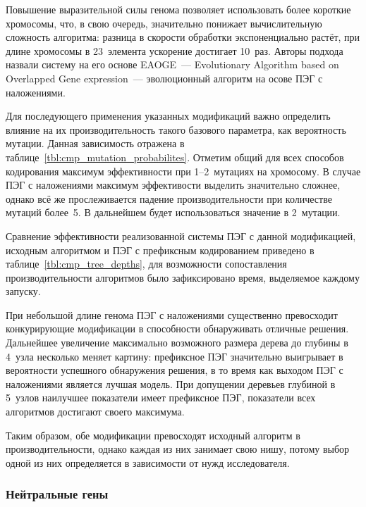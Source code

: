 Повышение выразительной силы генома позволяет использовать более короткие хромосомы, что, в свою очередь, значительно понижает вычислительную сложность алгоритма: разница в скорости обработки экспоненциально растёт, при длине хромосомы в 23~элемента ускорение достигает 10~раз. Авторы подхода назвали систему на его основе EAOGE~--- Evolutionary Algorithm based on Overlapped Gene expression~--- эволюционный алгоритм на осове ПЭГ с наложениями. 

Для последующего применения указанных модификаций важно определить влияние на их производительность такого базового параметра, как вероятность мутации. Данная зависимость отражена в таблице~\ref{tbl:cmp_mutation_probabilites}. Отметим общий для всех способов кодирования максимум эффективности при 1--2~мутациях на хромосому. В случае ПЭГ с наложениями максимум эффективости выделить значительно сложнее, однако всё же прослеживается падение производительности при количестве мутаций более~5. В дальнейшем будет использоваться значение в 2~мутации.



Сравнение эффективности реализованной системы ПЭГ с данной модификацией, исходным алгоритмом и ПЭГ с префиксным кодированием приведено в таблице~\ref{tbl:cmp_tree_depths}, для возможности сопоставления производительности алгоритмов было зафиксировано время, выделяемое каждому запуску.

При небольшой длине генома ПЭГ с наложениями существенно превосходит конкурирующие модификации в способности обнаруживать отличные решения. Дальнейшее увеличение максимально возможного размера дерева до глубины в 4~узла несколько меняет картину: префиксное ПЭГ значительно выигрывает в вероятности успешного обнаружения решения, в то время как выходом ПЭГ с наложениями является лучшая модель. При допущении деревьев глубиной в 5~узлов наилучшее показатели имеет префиксное ПЭГ, показатели всех алгоритмов достигают своего максимума.

Таким образом, обе модификации превосходят исходный алгоритм в производительности, однако каждая из них занимает свою нишу, потому выбор одной из них определяется в зависимости от нужд исследователя.




\subsubsection{Нейтральные гены}

